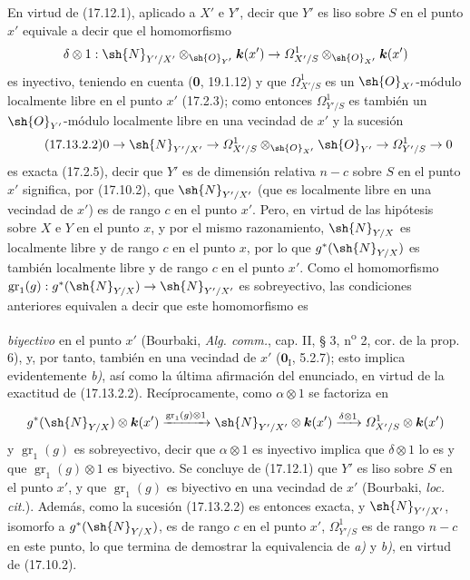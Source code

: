 En virtud de (17.12.1), aplicado a $X'$ e $Y'$, decir que $Y'$ es liso sobre $S$ en el punto $x'$ equivale a decir que el homomorfismo
\[
\delta\otimes1:\sh{N}_{Y'/X'}\otimes_{\sh{O}_{Y'}}\boldsymbol k(x')\to\varOmega^1_{X'/S}\otimes_{\sh{O}_{X'}}\boldsymbol k(x')
\]
es inyectivo, teniendo en cuenta (\textbf 0, 19.1.12) y que $\varOmega^1_{X'/S}$ es un $\sh{O}_{X'}$-módulo localmente libre en el punto $x'$ (17.2.3); como entonces $\varOmega^1_{Y'/S}$ es también un $\sh{O}_{Y'}$-módulo localmente libre en una vecindad de $x'$ y la sucesión
\[
\label{IV.17.13.2.2}
\tag{17.13.2.2}
0\to\sh{N}_{Y'/X'}\to\varOmega^1_{X'/S}\otimes_{\sh{O}_{X'}}\sh{O}_{Y'}\to\varOmega^1_{Y'/S}\to0
\]
es exacta (17.2.5), decir que $Y'$ es de dimensión relativa $n-c$ sobre $S$ en el punto $x'$ significa, por (17.10.2), que $\sh{N}_{Y'/X'}$ (que es localmente libre en una vecindad de $x'$) es de rango $c$ en el punto $x'$. Pero, en virtud de las hipótesis sobre $X$ e $Y$ en el punto $x$, y por el mismo razonamiento, $\sh{N}_{Y/X}$ es localmente libre y de rango $c$ en el punto $x$, por lo que $g^*(\sh{N}_{Y/X})$ es también localmente libre y de rango $c$ en el punto $x'$. Como el homomorfismo $\operatorname{gr}_1(g):g^*(\sh{N}_{Y/X})\to\sh{N}_{Y'/X'}$ es sobreyectivo, las condiciones anteriores equivalen a decir que este homomorfismo es


\emph{biyectivo} en el punto $x'$ (Bourbaki, \emph{Alg. comm.}, cap. II, § 3, n\textsuperscript{o} 2, cor. de la prop. 6), y, por tanto, también en una vecindad de $x'$ ($\mathbf{0}_{\mathrm I}$, 5.2.7); esto implica evidentemente \emph{b)}, así como la última afirmación del enunciado, en virtud de la exactitud de (17.13.2.2). Recíprocamente, como $\alpha\otimes1$ se factoriza en
\[
g^*(\sh{N}_{Y/X})\otimes\boldsymbol k(x')\xrightarrow{\operatorname{gr}_1(g)\otimes1}\sh{N}_{Y'/X'}\otimes\boldsymbol k(x')\xrightarrow{\delta\otimes1}\varOmega^1_{X'/S}\otimes\boldsymbol k(x')
\]
y $\operatorname{gr}_1(g)$ es sobreyectivo, decir que $\alpha\otimes1$ es inyectivo implica que $\delta\otimes1$ lo es y que $\operatorname{gr}_1(g)\otimes1$ es biyectivo. Se concluye de (17.12.1) que $Y'$ es liso sobre $S$ en el punto $x'$, y que $\operatorname{gr}_1(g)$ es biyectivo en una vecindad de $x'$ (Bourbaki, \emph{loc. cit.}). Además, como la sucesión (17.13.2.2) es entonces exacta, y $\sh{N}_{Y'/X'}$, isomorfo a $g^*(\sh{N}_{Y/X})$, es de rango $c$ en el punto $x'$, $\varOmega^1_{Y'/S}$ es de rango $n-c$ en este punto, lo que termina de demostrar la equivalencia de \emph{a)} y \emph{b)}, en virtud de (17.10.2).

